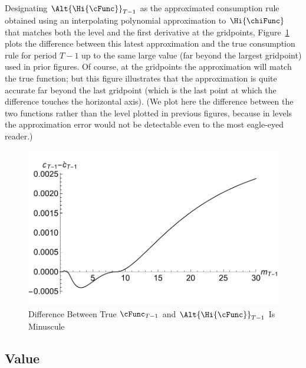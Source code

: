 \documentclass[titlepage]{\econtex}
\begin{document}
Designating $\Alt{\Hi{\cFunc}}_{T-1}$ as the approximated consumption rule
obtained using an interpolating polynomial approximation to $\Hi{\chiFunc}$
that matches both the level and the first derivative at the
gridpoints, Figure~\ref{fig:IntExpFOCInvPesReaOptGapPlot} plots the
difference between this latest approximation and the true consumption
rule for period $T-1$ up to the same large value (far beyond the
largest gridpoint) used in prior figures.  Of course, at the
gridpoints the approximation will match the true function; but this
figure illustrates that the approximation is quite accurate far beyond
the last gridpoint (which is the last point at which the difference
touches the horizontal axis).  (We plot here the difference between the
two functions rather than the level plotted in previous figures, because
in levels the approximation error would not be detectable even to the
most eagle-eyed reader.)



\hypertarget{IntExpFOCInvPesReaOptGapPlot}{}
\begin{figure}
  \includegraphics{./Figures/IntExpFOCInvPesReaOptGapPlot}
  \caption{Difference Between True $\cFunc_{T-1}$ and $\Alt{\Hi{\cFunc}}_{T-1}$ Is Minuscule}
  \label{fig:IntExpFOCInvPesReaOptGapPlot}
\end{figure}




\hypertarget{Value}{}
\subsection{Value}
\end{document}
